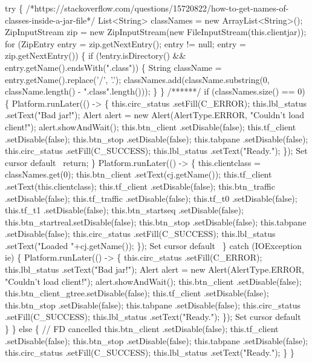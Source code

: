     try \{
/*https://stackoverflow.com/questions/15720822/how-to-get-names-of-classes-inside-a-jar-file*/
List<String> classNames = new ArrayList<String>();
ZipInputStream zip = new ZipInputStream(new FileInputStream(this.clientjar));
for (ZipEntry entry = zip.getNextEntry(); entry != null; entry = zip.getNextEntry()) \{
  if (!entry.isDirectory() && entry.getName().endsWith(".class")) \{
    String className = entry.getName().replace('/', '.');
    classNames.add(className.substring(0, className.length() - ".class".length()));
  \}
\}
/******/
      if (classNames.size() == 0) \{
        Platform.runLater(() -> \{
          this.circ_status  .setFill(C_ERROR);
          this.lbl_status   .setText("Bad jar!");
          Alert alert = new Alert(AlertType.ERROR, "Couldn't load client!");
          alert.showAndWait();
          this.btn_client   .setDisable(false);
          this.tf_client    .setDisable(false);
          this.btn_stop     .setDisable(false);
          this.tabpane      .setDisable(false);
          this.circ_status  .setFill(C_SUCCESS);
          this.lbl_status   .setText("Ready.");
        \});
        \LA{}Set cursor default~{\nwtagstyle{}}\RA{}
        return;
      \}
      Platform.runLater(() -> \{
        this.clientclass = classNames.get(0);
        this.btn_client   .setText(cj.getName());
        this.tf_client    .setText(this.clientclass);
        this.tf_client    .setDisable(false);
        this.btn_traffic  .setDisable(false);
        this.tf_traffic   .setDisable(false);
        this.tf_t0        .setDisable(false);
        this.tf_t1        .setDisable(false);
        this.btn_startseq .setDisable(false);
        this.btn_startreal.setDisable(false);
        this.btn_stop     .setDisable(false);
        this.tabpane      .setDisable(false);
        this.circ_status  .setFill(C_SUCCESS);
        this.lbl_status   .setText("Loaded "+cj.getName());
      \});
      \LA{}Set cursor default~{\nwtagstyle{}}\RA{}
    \} catch (IOException ie) \{
      Platform.runLater(() -> \{
        this.circ_status  .setFill(C_ERROR);
        this.lbl_status   .setText("Bad jar!");
        Alert alert = new Alert(AlertType.ERROR, "Couldn't load client!");
        alert.showAndWait();
        this.btn_client   .setDisable(false);
        this.btn_client_gtree.setDisable(false);
        this.tf_client    .setDisable(false);
        this.btn_stop     .setDisable(false);
        this.tabpane      .setDisable(false);
        this.circ_status  .setFill(C_SUCCESS);
        this.lbl_status   .setText("Ready.");
      \});
      \LA{}Set cursor default~{\nwtagstyle{}}\RA{}
    \}
  \} else \{
    // FD cancelled
    this.btn_client   .setDisable(false);
    this.tf_client    .setDisable(false);
    this.btn_stop     .setDisable(false);
    this.tabpane      .setDisable(false);
    this.circ_status  .setFill(C_SUCCESS);
    this.lbl_status   .setText("Ready.");
  \}
\}
\nwendcode{}\nwdocspar

